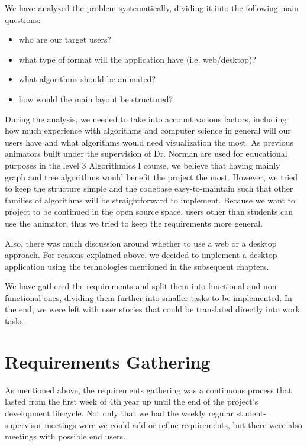 \documentclass{l4proj}
\begin{document}
We have analyzed the problem systematically, dividing it into the following main questions:

\begin{itemize}
\item who are our target users?
\item what type of format will the application have (i.e. web/desktop)?
\item what algorithms should be animated?
\item how would the main layout be structured?
\end{itemize}

During the analysis, we needed to take into account various factors, including how much experience with algorithms and
computer science in general will our users have and what algorithms would need visualization the most. As previous animators built under the supervision of Dr. Norman are used for educational purposes in the level 3 Algorithmics I course, we believe that having mainly graph and tree algorithms would benefit the project the most. However, we tried to keep the structure simple and the codebase easy-to-maintain such that other families of algorithms will be straightforward to implement. Because we want to project to be continued in the open source space, users other than students can use the animator, thus we tried to keep the requirements more general.

Also, there was much discussion around whether to use a web or a desktop approach. For reasons explained above, we
decided to implement a desktop application using the technologies mentioned in the subsequent chapters.

We have gathered the requirements and split them into functional and non-functional ones, dividing them further into
smaller tasks to be implemented. In the end, we were left with user stories that could be translated directly into work tasks.

\section{Requirements Gathering}

As mentioned above, the requirements gathering was a continuous process that lasted from the first week of 4th year up until the end of the project's development lifecycle. Not only that we had the weekly regular student-supervisor meetings were we could add or refine requirements, but there were also meetings with possible end users.
\end{document}
